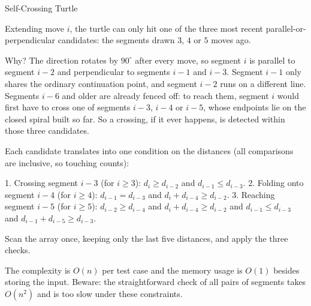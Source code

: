 \begin{tutorial}{Self-Crossing Turtle}

Extending move $i$, the turtle can only hit one of the three most recent parallel-or-perpendicular candidates: the segments drawn $3$, $4$ or $5$ moves ago.

Why? The direction rotates by $90^\circ$ after every move, so segment $i$ is parallel to segment $i - 2$ and perpendicular to segments $i - 1$ and $i - 3$. Segment $i - 1$ only shares the ordinary continuation point, and segment $i - 2$ runs on a different line. Segments $i - 6$ and older are already fenced off: to reach them, segment $i$ would first have to cross one of segments $i - 3$, $i - 4$ or $i - 5$, whose endpoints lie on the closed spiral built so far. So a crossing, if it ever happens, is detected within those three candidates.

Each candidate translates into one condition on the distances (all comparisons are inclusive, so touching counts):

1. Crossing segment $i - 3$ (for $i \ge 3$): $d_i \ge d_{i - 2}$ and $d_{i - 1} \le d_{i - 3}$.
2. Folding onto segment $i - 4$ (for $i \ge 4$): $d_{i - 1} = d_{i - 3}$ and $d_i + d_{i - 4} \ge d_{i - 2}$.
3. Reaching segment $i - 5$ (for $i \ge 5$): $d_{i - 2} \ge d_{i - 4}$ and $d_i + d_{i - 4} \ge d_{i - 2}$ and $d_{i - 1} \le d_{i - 3}$ and $d_{i - 1} + d_{i - 5} \ge d_{i - 3}$.

Scan the array once, keeping only the last five distances, and apply the three checks.

The complexity is $O(n)$ per test case and the memory usage is $O(1)$ besides storing the input. Beware: the straightforward check of all pairs of segments takes $O(n^2)$ and is too slow under these constraints.


\end{tutorial}
